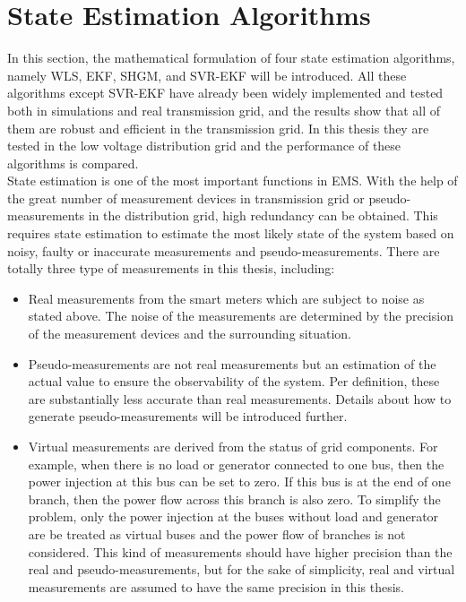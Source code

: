 \section{State Estimation Algorithms} \label{subsec:state_estimation}
In this section, the mathematical formulation of four state estimation algorithms, namely WLS, EKF, SHGM, and SVR-EKF will be introduced. All these algorithms except SVR-EKF have already been widely implemented and tested both in simulations and real transmission grid, and the results show that all of them are robust and efficient in the transmission grid. In this thesis they are tested in the low voltage distribution grid and the performance of these algorithms is compared.
\bigskip
\\State estimation is one of the most important functions in EMS. With the help of the great number of measurement devices in transmission grid or pseudo-measurements in the distribution grid, high redundancy can be obtained. This requires state estimation to estimate the most likely state of the system based on noisy, faulty or inaccurate measurements and pseudo-measurements. There are totally three type of measurements in this thesis, including: 
\begin{itemize}
    \item Real measurements from the smart meters which are subject to noise as stated above. The noise of the measurements are determined by the precision of the measurement devices and the surrounding situation. 
    \item Pseudo-measurements are not real measurements but an estimation of the actual value to ensure the observability of the system. Per definition, these are substantially less accurate than real measurements. Details about how to generate pseudo-measurements will be introduced further.
    \item  Virtual measurements are derived from the status of grid components. For example, when there is no load or generator connected to one bus, then the power injection at this bus can be set to zero. If this bus is at the end of one branch, then the power flow across this branch is also zero. To simplify the problem, only the power injection at the buses without load and generator are be treated as virtual buses and the power flow of branches is not considered. This kind of measurements should have higher precision than the real and pseudo-measurements, but for the sake of simplicity, real and virtual measurements are assumed to have the same precision in this thesis.
\end{itemize}

